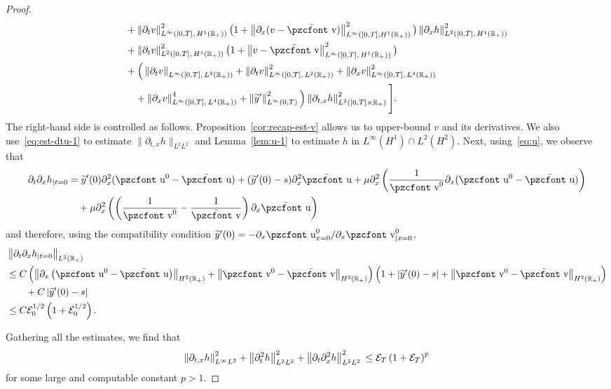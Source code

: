 \documentclass[10pt]{amsart}
\theoremstyle{definition}\newtheorem{defi}[theo]{Definition}\newtheorem{rema}[theo]{Remark}\newtheorem{exam}[theo]{Example}\newtheorem{exem}[theo]{Example}\newtheorem{nota}[theo]{Notation}
\newcommand{\mathpzc}[1]{\text{\pzcfont #1}}
\newcommand{\R}{\mathbb{R}}
\newcommand{\p}{\partial}
\newcommand{\bv}{\bar{\mathpzc{v}}}
\newcommand{\bu}{\bar{\mathpzc{u}}}
\newcommand{\cE}{\mathcal E}
\newcommand{\tv}{\mathpzc{v}}
\newcommand{\tu}{\mathpzc{u}}
\newcommand{\ty}{\widetilde{y}}
\begin{document}
\begin{proof}
\begin{align*}
& \qquad + \left\|\p_t v\right\|_{L^\infty\left([0,T],\,H^1(\R_+)\right)}^2 \big(1+ \left\|\p_x (v-\bv)\right\|_{L^\infty\left([0,T];H^1(\R_+)\right)}^2\big) \left\|\p_xh\right\|_{L^2\left([0,T],\,H^1(\R_+)\right)}^2 \\
& \qquad + \left\|\p_t v\right\|_{L^2\left([0,T],\,H^1(\R_+)\right)}^2\big(1+ \left\|v-\bv\right\|_{L^\infty\left([0,T],\,H^1(\R_+)\right)}^2\big) \\
& \qquad + \Big(\left\|\partial_t v\right\|_{L^\infty\left([0,T],\,L^2(\R_+)\right)} + \left\|\partial_t v\right\|_{L^\infty\left([0,T],\,L^2(\R_+)\right)}^2+ \left\|\partial_x v\right\|_{L^\infty \left([0,T],\,L^4(\R_+)\right)}^2\\
&\qquad \quad+ \left\|\partial_x v\right\|_{L^\infty \left([0,T],\,L^4(\R_+)\right)}^4 + \left\|\ty'\right\|_{L^\infty(0,T)}^2\Big) \left\|\partial_{t,x}h\right\|_{L^2\left([0,T] \times \R_+\right)}^2 \Bigg].
\end{align*}
\endgroup
The right-hand side is controlled as follows. Proposition~\ref{cor:recap-est-v} allows us to upper-bound $v$ and its derivatives. We also use~\eqref{eq:est-dtu-1} to estimate $\|\partial_{t,x}h\|_{L^2 L^2}$ and Lemma~\ref{lem:u-1} to estimate $h$ in $L^\infty(H^1)\cap L^2(H^2)$. Next, using~\eqref{eq:u}, we observe that
\begin{align*}
\partial_t \partial_xh_{|t=0} &=\ty'(0) \p_x^2(\tu^0 - \bu) + (\ty'(0)-s)\p_x^2\bu + \mu \partial^2_x\left(\frac{1}{\tv^0}\partial_x (\tu^0 -\bu)\right)\\&\quad + \mu \partial^2_x\left(\left(\frac{1}{\tv^0} - \frac{1}{\bv}\right) \partial_x \bu\right)
\end{align*}
and therefore, using the compatibility condition $\ty'(0)=-\p_x \tu^0_{x=0}/\p_x \tv^0_{|x=0}$,
\begin{align*}
& \left\|\partial_t \partial_xh_{|t=0}\right\|_{L^2(\R_+)} \\
& \leq C \left(\left\|\partial_x \left(\tu^0-\bu\right)\right\|_{H^2(\R_+)} + \left\|\tv^0-\bv\right\|_{H^2(\R_+)}\right)\left(1 + \left|\ty'(0)-s\right| + \left\|\tv^0-\bv\right\|_{H^2(\R_+)}\right) \\
& \qquad + C \left|\ty'(0) - s\right|\\
&\leq C \cE_0^{1/2} \left(1+ \cE_0^{1/2}\right).
\end{align*}

Gathering all the estimates, we find that
\[
\left\|\partial_{t,x}h\right\|_{L^\infty L^2}^2 + \left\|\partial^2_th\right\|_{L^2 L^2}^2 + \left\|\partial_t \partial^2_xh\right\|_{L^2 L^2}^2 \\
\leq \cE_T\left(1 + \cE_T\right)^p
\]
for some large and computable constant $p>1$.
\end{proof}
\end{document}
